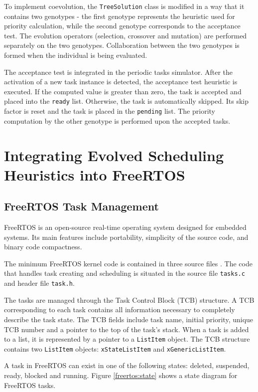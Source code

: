 To implement coevolution, the \texttt{TreeSolution} class is modified in a way that it contains two genotypes - the first genotype represents the heuristic used for priority calculation, while the second genotype corresponds to the acceptance test. 
The evolution operators (selection, crossover and mutation) are performed separately on the two genotypes.
Collaboration between the two genotypes is formed when the individual is being evaluated.

The acceptance test is integrated in the periodic tasks simulator.
After the activation of a new task instance is detected, the acceptance test heuristic is executed.
If the computed value is greater than zero, the task is accepted and placed into the \texttt{ready} list.
Otherwise, the task is automatically skipped. 
Its skip factor is reset and the task is placed in the \texttt{pending} list.
The priority computation by the other genotype is performed upon the accepted tasks.

\section{Integrating Evolved Scheduling Heuristics into FreeRTOS}
\subsection{FreeRTOS Task Management}
FreeRTOS is an open-source real-time operating system designed for embedded systems. 
Its main features include portability, simplicity of the source code, and binary code compactness. 

The minimum FreeRTOS kernel code is contained in three source files \cite{brown2012architecture}. 
The code that handles task creating and scheduling is situated in the source file \verb$tasks.c$ and header file \verb$task.h$.

The tasks are managed through the Task Control Block (TCB) structure. 
A TCB corresponding to each task contains all information necessary to completely describe the task state. 
The TCB fields include task name, initial priority, unique TCB number and a pointer to the top of the task's stack. 
When a task is added to a list, it is represented by a pointer to a \verb$ListItem$ object. 
The TCB structure contains two \verb$ListItem$ objects: \verb$xStateListItem$ and \verb$xGenericListItem$.

A task in FreeRTOS can exist in one of the following states: deleted, suspended, ready, blocked and running. 
Figure \ref{freertos:state} shows a state diagram for FreeRTOS tasks. 

